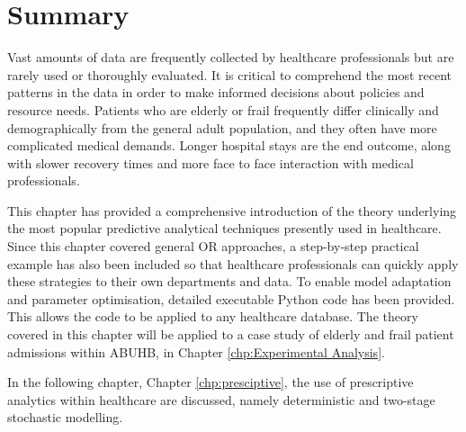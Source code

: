 \documentclass[../thesis.tex]{subfiles}
\begin{document}
\section{Summary}
Vast amounts of data are frequently collected by healthcare professionals but are rarely used or thoroughly evaluated. It is critical to comprehend the most recent patterns in the data in order to make informed decisions about policies and resource needs. Patients who are elderly or frail frequently differ clinically and demographically from the general adult population, and they often have more complicated medical demands. Longer hospital stays are the end outcome, along with slower recovery times and more face to face interaction with medical professionals.

This chapter has provided a comprehensive introduction of the theory underlying the most popular predictive analytical techniques presently used in healthcare. Since this chapter covered general OR approaches, a step-by-step practical example has also been included so that healthcare professionals can quickly apply these strategies to their own departments and data. To enable model adaptation and parameter optimisation, detailed executable Python code has been provided. This allows the code to be applied to any healthcare database. The theory covered in this chapter will be applied to a case study of elderly and frail patient admissions within ABUHB, in Chapter \ref{chp:Experimental Analysis}.

In the following chapter, Chapter \ref{chp:presciptive}, the use of prescriptive analytics within healthcare are discussed, namely deterministic and two-stage stochastic modelling.
\end{document}
